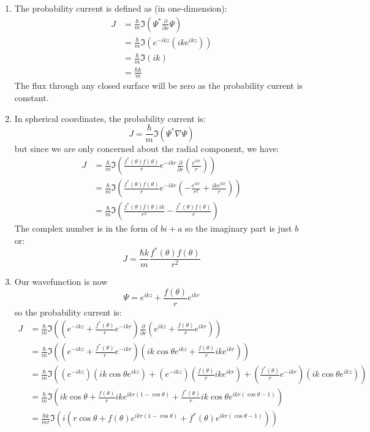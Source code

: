 \begin{sol}
\begin{enumerate}[label=\textbf{(\alph*)}]
\item The probability current is defined as (in one-dimension):
\begin{align*}
    J &= \frac{\hbar}{m} \Im\left(\Psi^*\frac{\partial}{\partial x}\Psi\right) \\
    &= \frac{\hbar}{m} \Im\left(e^{-ikz}(ike^{ikz})\right) \\
    &= \frac{\hbar}{m}\Im(ik) \\
    &= \frac{\hbar k}{m}
\end{align*}
The flux through any closed surface will be zero as the probability current is constant.
\item In spherical coordinates, the probability current is:
$$J = \frac{\hbar}{m}\Im\left(\Psi^*\nabla \Psi\right)$$
but since we are only concerned about the radial component, we have:
\begin{align*}
    J &= \frac{\hbar}{m}\Im\left(\frac{f^*(\theta)f(\theta)}{r}e^{-ikr}\frac{\partial}{\partial r}\left(\frac{e^{ikr}}{r}\right)\right) \\
      &= \frac{\hbar}{m}\Im\left(\frac{f^*(\theta)f(\theta)}{r}e^{-ikr}\left(-\frac{e^{ikr}}{r^2}+\frac{ike^{ikr}}{r}\right)\right) \\
      &= \frac{\hbar}{m}\Im\left(\frac{f^*(\theta)f(\theta)ik}{r^2}-\frac{f^*(\theta)f(\theta)}{r}\right)
\end{align*}
The complex number is in the form of $bi+a$ so the imaginary part is just $b$ or:
$$J = \frac{\hbar k}{m} \frac{f^*(\theta)f(\theta)}{r^2}$$
\item Our wavefunction is now
$$\Psi = e^{ikz}+\frac{f(\theta)}{r}e^{ikr}$$
so the probability current is:
\begin{align*}
    J &= \frac{\hbar}{m}\Im
    \left(
        \left(
            e^{-ikz} + \frac{f^*(\theta)}{r}e^{-ikr}
        \right)
        \frac{\partial}{\partial r}
        \left(
        e^{ikz} + \frac{f(\theta)}{r}e^{ikr}
        \right)
    \right) \\
    &= \frac{\hbar}{m}\Im
    \left(
        \left(
            e^{-ikz} + \frac{f^*(\theta)}{r}e^{-ikr}
        \right)
        \left(
        ik\cos\theta e^{ikz} + \frac{f(\theta)}{r}ike^{ikr}
        \right)
    \right) \\
        &= \frac{\hbar}{m}\Im
    \left(
        \left(e^{-ikz}\right)\left(ik\cos\theta e^{ikz}\right) + \left(e^{-ikz}\right)\left(\frac{f(\theta)}{r}ike^{ikr}\right)+\left(\frac{f^*(\theta)}{r}e^{-ikr}\right)\left(ik\cos\theta e^{ikz}\right)
    \right) \\
    &= \frac{\hbar}{m} \Im
    \left(
    ik\cos\theta+\frac{f(\theta)}{r}ike^{ikr(1-\cos\theta)}+\frac{f^*(\theta)}{r}ik\cos\theta e^{ikr(\cos\theta-1)}
    \right) \\
    &= \frac{\hbar k}{mr} \Im \left(i\left(
    r\cos\theta + f(\theta)e^{ikr(1-\cos\theta)}+f^*(\theta)e^{ikr(\cos\theta-1)}
    \right)\right)
\end{align*}
\end{enumerate}
\end{sol}